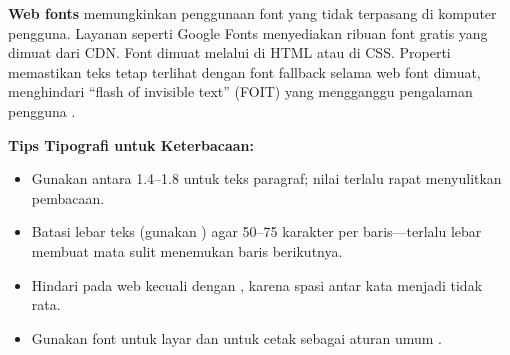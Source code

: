 \textbf{Web fonts} memungkinkan penggunaan font yang tidak terpasang di komputer pengguna. Layanan seperti Google Fonts menyediakan ribuan font gratis yang dimuat dari CDN. Font dimuat melalui  di HTML atau  di CSS. Properti  memastikan teks tetap terlihat dengan font fallback selama web font dimuat, menghindari ``flash of invisible text'' (FOIT) yang mengganggu pengalaman pengguna \cite{webdevCss}.


\begin{catatan}
\textbf{Tips Tipografi untuk Keterbacaan:}
\begin{itemize}
  \item Gunakan  antara 1.4--1.8 untuk teks paragraf; nilai terlalu rapat menyulitkan pembacaan.
  \item Batasi lebar teks (gunakan ) agar 50--75 karakter per baris---terlalu lebar membuat mata sulit menemukan baris berikutnya.
  \item Hindari  pada web kecuali dengan , karena spasi antar kata menjadi tidak rata.
  \item Gunakan font  untuk layar dan  untuk cetak sebagai aturan umum \cite{cssTricks}.
\end{itemize}
\end{catatan}

